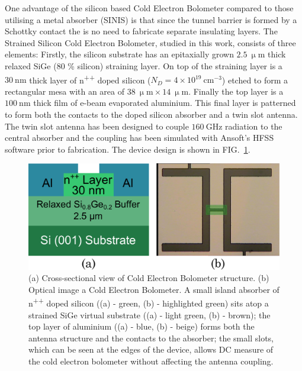 \documentclass[aip, apl, a4paper, amsmath,amssymb, reprint]{revtex4-1}
\begin{document}
One advantage of the silicon based Cold Electron Bolometer compared to those utilising a metal absorber (SINIS) is that since the tunnel barrier is formed by a Schottky contact the is no need to fabricate separate insulating layers. The Strained Silicon Cold Electron Bolometer, studied in this work, consists of three elements: Firstly, the silicon substrate has an epitaxially grown $2.5~\mathrm{\upmu m}$ thick relaxed SiGe (80 \% silicon) straining layer.  On top of the straining layer is a $30~\mathrm{nm}$ thick layer of n\textsuperscript{++} doped silicon ($N_{D} = 4 \times 10^{19}~\mathrm{cm}^{-3}$) etched to form a rectangular mesa with an area of $38~\mathrm{\upmu m} \times 14~\mathrm{\upmu m}$. Finally the top layer is a $100~\mathrm{nm}$ thick film of e-beam evaporated aluminium. This final layer is patterned to form both the contacts to the doped silicon absorber and a twin slot antenna. The twin slot antenna has been designed to couple $160~\mathrm{GHz}$ radiation to the central absorber and the coupling has been simulated with Ansoft's HFSS software prior to fabrication. The device design is shown in FIG.~\ref{fig:device_design}.
\begin{figure}[ht]
\includegraphics[width = 0.8\columnwidth]{CEB_structure_strained_APL}
\caption{(a) Cross-sectional view of Cold Electron Bolometer structure. (b) Optical image a Cold Electron Bolometer. A small island absorber of n\textsuperscript{++} doped silicon ((a) - green, (b) - highlighted green) sits atop a strained SiGe virtual substrate ((a) - light green, (b) - brown); the top layer of aluminium ((a) - blue, (b) - beige) forms both the antenna structure and the contacts to the absorber; the small slots, which can be seen at the edges of the device, allows DC measure of the cold electron bolometer without affecting the antenna coupling.}\label{fig:device_design}
\end{figure}
\end{document}
